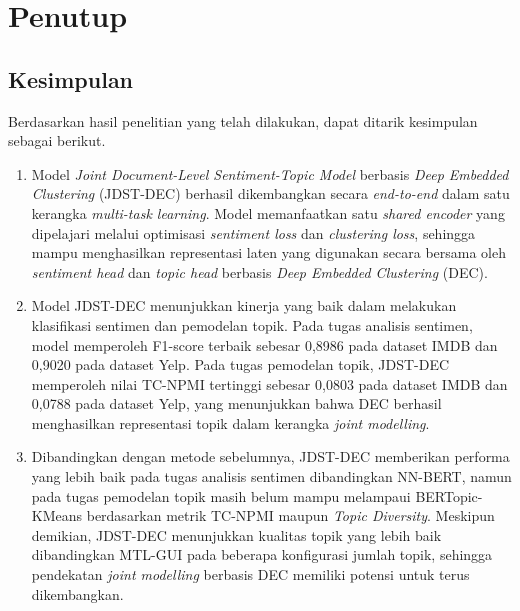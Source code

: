 \chapter{Penutup}

\section{Kesimpulan}

Berdasarkan hasil penelitian yang telah dilakukan, dapat ditarik kesimpulan sebagai berikut.

\begin{enumerate}
    \item Model \textit{Joint Document-Level Sentiment-Topic Model} berbasis \textit{Deep Embedded Clustering} (JDST-DEC) berhasil dikembangkan secara \textit{end-to-end} dalam satu kerangka \textit{multi-task learning}. Model memanfaatkan satu \textit{shared encoder} yang dipelajari melalui optimisasi \textit{sentiment loss} dan \textit{clustering loss}, sehingga mampu menghasilkan representasi laten yang digunakan secara bersama oleh \textit{sentiment head} dan \textit{topic head} berbasis \textit{Deep Embedded Clustering} (DEC).

    \item Model JDST-DEC menunjukkan kinerja yang baik dalam melakukan klasifikasi sentimen dan pemodelan topik. Pada tugas analisis sentimen, model memperoleh F1-score terbaik sebesar 0{,}8986 pada dataset IMDB dan 0{,}9020 pada dataset Yelp. Pada tugas pemodelan topik, JDST-DEC memperoleh nilai TC-NPMI tertinggi sebesar 0{,}0803 pada dataset IMDB dan 0{,}0788 pada dataset Yelp, yang menunjukkan bahwa DEC berhasil menghasilkan representasi topik dalam kerangka \textit{joint modelling}.

    \item Dibandingkan dengan metode sebelumnya, JDST-DEC memberikan performa yang lebih baik pada tugas analisis sentimen dibandingkan NN-BERT, namun pada tugas pemodelan topik masih belum mampu melampaui BERTopic-KMeans berdasarkan metrik TC-NPMI maupun \textit{Topic Diversity}. Meskipun demikian, JDST-DEC menunjukkan kualitas topik yang lebih baik dibandingkan MTL-GUI pada beberapa konfigurasi jumlah topik, sehingga pendekatan \textit{joint modelling} berbasis DEC memiliki potensi untuk terus dikembangkan.
\end{enumerate}


